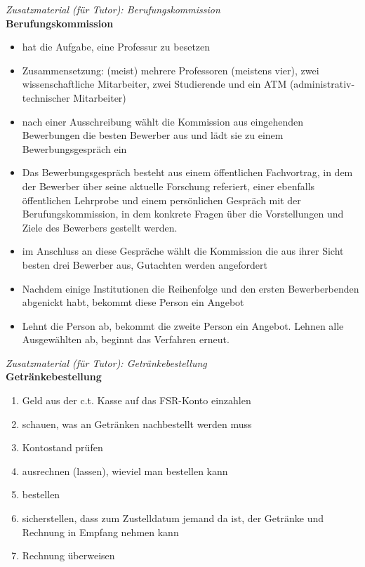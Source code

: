 \documentclass[a4paper,11pt]{scrartcl} %
\begin{document}
\begin{framed}
\textit{Zusatzmaterial (für Tutor): Berufungskommission} \\

\textbf{Berufungskommission} 
\begin{itemize} 
\item hat die Aufgabe, eine Professur zu besetzen 
\item Zusammensetzung: (meist) mehrere Professoren (meistens vier),
zwei wissenschaftliche Mitarbeiter, zwei Studierende und ein ATM (administrativ-technischer Mitarbeiter)
\item nach einer Ausschreibung wählt die Kommission aus eingehenden 
Bewerbungen die besten Bewerber aus und lädt sie zu einem 
Bewerbungsgespräch ein
\item Das Bewerbungsgespräch besteht aus einem öffentlichen 
Fachvortrag, in dem der Bewerber über seine aktuelle Forschung 
referiert, einer ebenfalls öffentlichen Lehrprobe und einem 
persönlichen Gespräch mit der 
Berufungskommission, in dem konkrete Fragen über die Vorstellungen 
und Ziele des Bewerbers gestellt werden.
\item im Anschluss an diese Gespräche wählt die Kommission die aus 
ihrer Sicht besten drei Bewerber aus, Gutachten werden angefordert
\item Nachdem einige Institutionen die Reihenfolge und den ersten
Bewerberbenden abgenickt habt, bekommt diese Person ein Angebot
\item Lehnt die Person ab, bekommt die zweite Person ein Angebot. 
Lehnen alle Ausgewählten ab, beginnt das Verfahren erneut.
\end{itemize} 
\end{framed}


\begin{framed}
\textit{Zusatzmaterial (für Tutor): Getränkebestellung}\\

\textbf{Getränkebestellung}\\

\begin{enumerate}
\item Geld aus der c.t. Kasse auf das FSR-Konto einzahlen
\item schauen, was an Getränken nachbestellt werden muss
\item Kontostand prüfen
\item ausrechnen (lassen), wieviel man bestellen kann
\item bestellen
\item sicherstellen, dass zum Zustelldatum jemand da ist, der Getränke und Rechnung in Empfang nehmen kann
\item Rechnung überweisen
\end{enumerate}
\end{framed}
\end{document}
